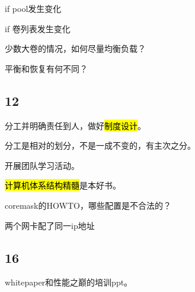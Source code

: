 if pool发生变化

if 卷列表发生变化

少数大卷的情况，如何尽量均衡负载？

平衡和恢复有何不同？

\subsection{12}

分工并明确责任到人，做好\hl{制度设计}。

分工是相对的划分，不是一成不变的，有主次之分。

开展团队学习活动。

\hl{计算机体系结构精髓}是本好书。

coremask的HOWTO，哪些配置是不合法的？

两个网卡配了同一ip地址

\subsection{16}

whitepaper和性能之巅的培训ppt。



